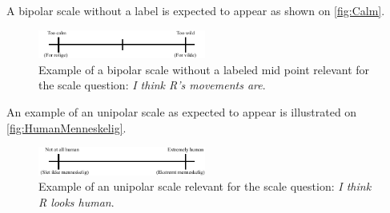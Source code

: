 \noindent
% 
A bipolar scale without a label is expected to appear as shown on \autoref{fig:Calm}.  
%
\begin{figure}[H]
\centering
\includegraphics[width = 0.49\textwidth]{Figure/CalmWild} 
\caption{Example of a bipolar scale without a labeled mid point relevant for the scale question: \textit{I think R's movements are}.}
\label{fig:Calm}
\end{figure}
\noindent
%
An example of an unipolar scale as expected to appear is illustrated on \autoref{fig:HumanMenneskelig}.
%
\begin{figure}[H]
\centering
\includegraphics[width = 0.49\textwidth]{Figure/HumanMenneskelig} 
\caption{Example of an unipolar scale relevant for the scale question: \textit{I think R looks human}.}
\label{fig:HumanMenneskelig}
\end{figure}
\noindent
%
